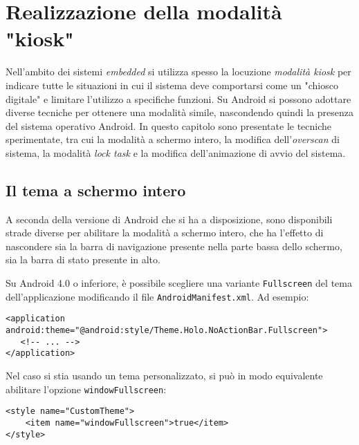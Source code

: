 \chapter{Realizzazione della modalità "kiosk"}
\label{cha:kiosk}

Nell'ambito dei sistemi \emph{embedded} si utilizza spesso la locuzione \emph{modalità kiosk} per indicare tutte le situazioni in cui il sistema deve comportarsi come un "chiosco digitale" e limitare l'utilizzo a specifiche funzioni. Su Android si possono adottare diverse tecniche per ottenere una modalità simile, nascondendo quindi la presenza del sistema operativo Android. In questo capitolo sono presentate le tecniche sperimentate, tra cui la modalità a schermo intero, la modifica dell'\emph{overscan} di sistema, la modalità \emph{lock task} e la modifica dell'animazione di avvio del sistema.

\section{Il tema a schermo intero}
\label{sec:kiosk_fullscreen}

A seconda della versione di Android che si ha a disposizione, sono disponibili strade diverse per abilitare la modalità a schermo intero, che ha l'effetto di nascondere sia la barra di navigazione presente nella parte bassa dello schermo, sia la barra di stato presente in alto.

Su Android 4.0 o inferiore, è possibile scegliere una variante \texttt{Fullscreen} del tema dell'applicazione modificando il file \texttt{AndroidManifest.xml}\footnotemark. Ad esempio:

\begin{verbatim}
<application android:theme="@android:style/Theme.Holo.NoActionBar.Fullscreen">
   <!-- ... -->
</application>
\end{verbatim}


Nel caso si stia usando un tema personalizzato, si può in modo equivalente abilitare l'opzione \texttt{windowFullscreen}\footnotemark:

\begin{verbatim}
<style name="CustomTheme">
    <item name="windowFullscreen">true</item>
</style>
\end{verbatim}


